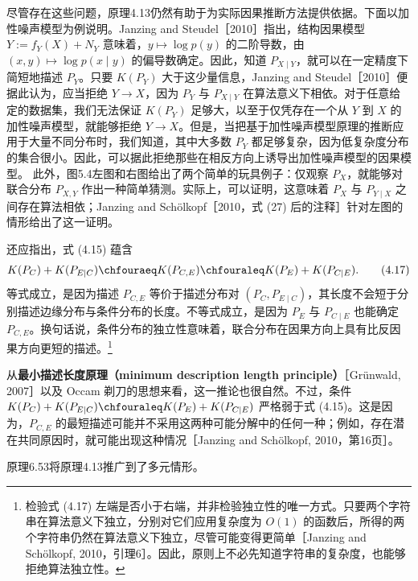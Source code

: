 尽管存在这些问题，原理4.13仍然有助于为实际因果推断方法提供依据。下面以加性噪声模型为例说明。Janzing and Steudel［2010］指出，结构因果模型 $Y:=f_Y(X)+N_Y$ 意味着，$y\mapsto\log p(y)$ 的二阶导数，由 $(x,y)\mapsto\log p(x\mid y)$ 的偏导数确定。因此，知道 $P_{X\mid Y}$，就可以在一定精度下简短地描述 $P_Y$。只要 $K(P_Y)$ 大于这少量信息，Janzing and Steudel［2010］便据此认为，应当拒绝 $Y\to X$，因为 $P_Y$ 与 $P_{X\mid Y}$ 在算法意义下相依。对于任意给定的数据集，我们无法保证 $K(P_Y)$ 足够大，以至于仅凭存在一个从 $Y$ 到 $X$ 的加性噪声模型，就能够拒绝 $Y\to X$。但是，当把基于加性噪声模型原理的推断应用于大量不同分布时，我们知道，其中大多数 $P_Y$ 都足够复杂，因为低复杂度分布的集合很小。因此，可以据此拒绝那些在相反方向上诱导出加性噪声模型的因果模型。
此外，图5.4左图和右图给出了两个简单的玩具例子：仅观察 $P_X$，就能够对联合分布 $P_{X,Y}$ 作出一种简单猜测。实际上，可以证明，这意味着 $P_X$ 与 $P_{Y\mid X}$ 之间存在算法相依；Janzing and Schölkopf［2010，式 (27) 后的注释］针对左图的情形给出了这一证明。

还应指出，式 (4.15) 蕴含
\begin{equation}
 K(P_C)+K(P_{E\mid C})
 \chfouraeq K(P_{C,E})
 \chfouraleq K(P_E)+K(P_{C\mid E}).
 \tag{4.17}
\end{equation}
等式成立，是因为描述 $P_{C,E}$ 等价于描述分布对 $(P_C,P_{E\mid C})$，其长度不会短于分别描述边缘分布与条件分布的长度。不等式成立，是因为 $P_E$ 与 $P_{C\mid E}$ 也能确定 $P_{C,E}$。换句话说，条件分布的独立性意味着，联合分布在因果方向上具有比反因果方向更短的描述。\footnote{检验式 (4.17) 左端是否小于右端，并非检验独立性的唯一方式。只要两个字符串在算法意义下独立，分别对它们应用复杂度为 $O(1)$ 的函数后，所得的两个字符串仍然在算法意义下独立，尽管可能变得更简单［Janzing and Schölkopf, 2010，引理6］。因此，原则上不必先知道字符串的复杂度，也能够拒绝算法独立性。}

从\textbf{最小描述长度原理（minimum description length principle）}［Grünwald, 2007］以及 Occam 剃刀的思想来看，这一推论也很自然。不过，条件 $K(P_C)+K(P_{E\mid C})\chfouraleq K(P_E)+K(P_{C\mid E})$ 严格弱于式 (4.15)。这是因为，$P_{C,E}$ 的最短描述可能并不采用这两种可能分解中的任何一种；例如，存在潜在共同原因时，就可能出现这种情况［Janzing and Schölkopf, 2010，第16页］。

原理6.53将原理4.13推广到了多元情形。
